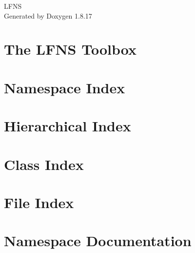 \let\mypdfximage\pdfximage\def\pdfximage{\immediate\mypdfximage}\documentclass[twoside]{book}
\newcommand{\+}{\discretionary{\mbox{\scriptsize$\hookleftarrow$}}{}{}}
\newcommand{\clearemptydoublepage}{%
  \newpage{\pagestyle{empty}\cleardoublepage}%
}
\begin{document}
\hypersetup{pageanchor=false,
             bookmarksnumbered=true,
             pdfencoding=unicode
            }
\begin{titlepage}
\vspace*{7cm}
\begin{center}%
{\Large L\+F\+NS }\\
\vspace*{1cm}
{\large Generated by Doxygen 1.8.17}\\
\end{center}
\end{titlepage}
\clearemptydoublepage
{}
\tableofcontents
\clearemptydoublepage
{}
\hypersetup{pageanchor=true}

\chapter{The L\+F\+NS Toolbox}
\label{index}\hypertarget{index}{}
\chapter{Namespace Index}

\chapter{Hierarchical Index}

\chapter{Class Index}

\chapter{File Index}

\chapter{Namespace Documentation}













\end{document}
